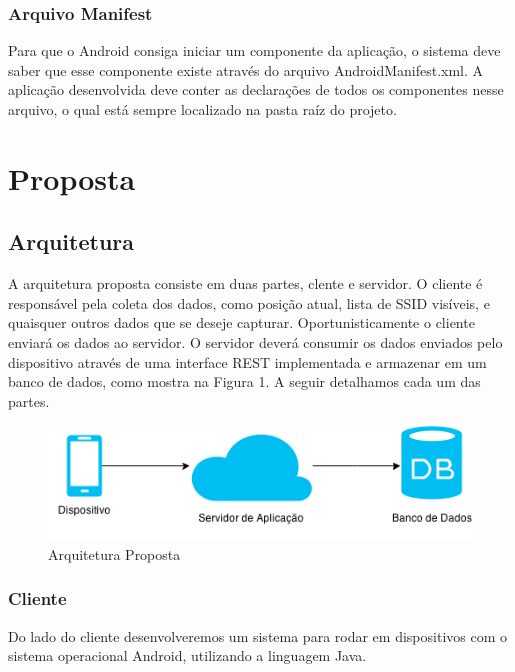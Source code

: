 \documentclass[12pt, %
openright, 
oneside,
a4paper,
brazil]{facom-ufu-abntex2}
\begin{document}
	\subsection{Arquivo Manifest}
	Para que o Android consiga iniciar um componente da aplicação, o sistema deve saber que esse componente existe através do arquivo AndroidManifest.xml. A aplicação desenvolvida deve conter as declarações de todos os componentes nesse arquivo, o qual está sempre localizado na pasta raíz do projeto.		

\chapter{Proposta}
\section{Arquitetura}
A arquitetura proposta consiste em duas partes, clente e servidor. O cliente é responsável pela coleta dos dados, como posição atual, lista de SSID visíveis, e quaisquer outros dados que se deseje capturar. Oportunisticamente o cliente enviará os dados ao servidor. O servidor deverá consumir os dados enviados pelo dispositivo através de uma interface REST implementada e armazenar em um banco de dados, como mostra na Figura 1.  A seguir detalhamos cada um das partes.

\begin{figure}[hbt]
  \includegraphics{arquiteturaProposta}
  \caption{Arquitetura Proposta}
\end{figure}


\subsection{Cliente}
Do lado do cliente desenvolveremos um sistema para rodar em dispositivos com o sistema operacional Android, utilizando a linguagem Java.
\end{document}
